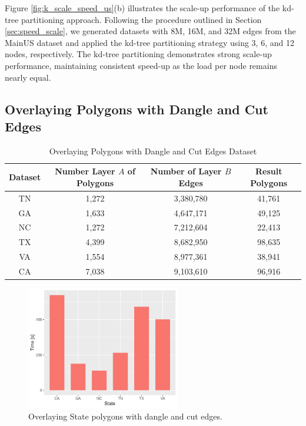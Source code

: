 Figure \ref{fig:k_scale_speed_us}(b) illustrates the scale-up performance of the kd-tree partitioning approach. Following the procedure outlined in Section \ref{sec:speed_scale}, we generated datasets with 8M, 16M, and 32M edges from the MainUS dataset and applied the kd-tree partitioning strategy using 3, 6, and 12 nodes, respectively. The kd-tree partitioning demonstrates strong scale-up performance, maintaining consistent speed-up as the load per node remains nearly equal.

\subsection{Overlaying Polygons with Dangle and Cut Edges}

\begin{table}
    \small
    \caption{Overlaying Polygons with Dangle and Cut Edges Dataset}
    \label{tab:dangles}
    \begin{tabular}{c c c c}
        \toprule
        Dataset & Number Layer $A$ of Polygons & Number of Layer $B$ Edges & Result Polygons \\
        \midrule
        TN & 1,272 & 3,380,780 & 41,761 \\
        GA & 1,633 & 4,647,171 & 49,125 \\
        NC & 1,272 & 7,212,604 & 22,413 \\
        TX & 4,399  & 8,682,950 & 98,635 \\
        VA & 1,554 & 8,977,361 & 38,941 \\
        CA & 7,038 & 9,103,610 & 96,916\\
        \bottomrule
    \end{tabular}
\end{table}

\begin{figure}
    \centering
    \includegraphics[width=0.6\textwidth]{chapterExtension/states.pdf}
    \caption{Overlaying State polygons with dangle and cut edges.}
    \label{fig:dangle}
\end{figure}

